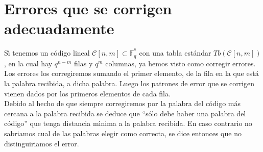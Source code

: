 %
%

%
\newpage
%
\section{Errores que se corrigen adecuadamente}

S\'{\i} tenemos un c\'odigo lineal $\mathcal{C}[n,m]\subset \mathbb{F}^{^n}_q$
con una tabla est\'andar $Tb(\mathcal{C}[n,m])$, en la cual hay $q^{n-m}$ filas
y $q^m$ columnas, ya hemos visto como corregir errores. Los errores los
corregiremos sumando el primer elemento, de la fila en la que est\'a la palabra
recibida, a dicha palabra. Luego los patrones de error que se corrigen vienen
dados por los primeros elementos de cada fila.\\ 

Debido al hecho de que siempre corregiremos por la palabra del c\'odigo m\'as
cercana a la palabra recibida se deduce que ``s\'olo debe haber una palabra
del c\'odigo'' que tenga distancia m\'{\i}nima a la palabra recibida. En caso
contrario no sabriamos cual de las palabras elegir como correcta, se dice 
entonces que no distinguiriamos el error.\\

